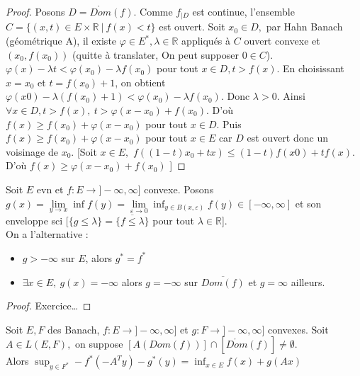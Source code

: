 \begin{proof}
    Posons $D=\mathring{Dom}(f)$. Comme $f_{|D}$ est continue, l'ensemble $C=\{(x,t)\in E\times \mathbb{R} \ |\ f(x)<t\} $ est ouvert. Soit $x_0\in D,$ par Hahn Banach (géométrique A), il existe $\varphi \in E^*,\lambda\in\mathbb{R} $ appliqués à $C$ ouvert convexe et $(x_0,f(x_0))$ (quitte à translater, On peut supposer $0\in C$).\\
    $\varphi (x)-\lambda t<\varphi (x_0)-\lambda f(x_0)$ pour tout $x\in D, t>f(x)$. En choisissant $x=x_0$ et $t=f(x_0)+1$, on obtient $\varphi (x0)-\lambda \left( f(x_0)+1 \right) <\varphi (x_0)-\lambda f(x_0).$ Donc $\lambda>0.$ Ainsi $\forall x\in D,t>f(x),\ t>\varphi (x-x_0)+f(x_0).$ D'où $f(x)\ge f(x_0)+\varphi (x-x_0)$ pour tout $x\in D.$ Puis $f(x)\ge f(x_0)+\varphi (x-x_0)$ pour tout $x\in E$ car $D$ est ouvert donc un voisinage de $x_0.$ [Soit $x\in E,$ $f((1-t)x_0+tx)\le (1-t)f(x0)+tf(x).$ D'où $f(x)\ge \varphi (x-x_0)+f(x_0)$ ]
\end{proof}
\begin{lemme}
    Soit $E$ evn et $f:E\to ]-\infty ,\infty ]$ convexe. Posons $g(x)=\lim\limits_{y\to x}\inf f(y)=\lim\limits_{\varepsilon \to 0} \inf_{y\in B(x,\varepsilon )}f(y)\in [-\infty ,\infty ] $ et son enveloppe sci [$\{g\le \lambda\} =\overline{\{f\le \lambda\} }$ pour tout $\lambda\in \mathbb{R} $].\\
    On a l'alternative :
    \begin{itemize}
        \item $g>-\infty $ sur $E$, alors $g^*=f^*$
        \item $\exists x\in E,\ g(x)=-\infty $ alors $g=-\infty $ sur $\overline{Dom(f)}$ et $g=\infty $ ailleurs.
    \end{itemize}
\end{lemme}
\begin{proof}
    Exercice\ldots
\end{proof}
\begin{theoreme}
    Soit $E,F$ des Banach,  $f:E\to ]-\infty ,\infty ]$ et $g:F\to ]-\infty ,\infty ]$ convexes. Soit $A\in L(E,F),$ on suppose $\left[ A(Dom(f)) \right] \cap \left[ \mathring{Dom}(f) \right] \neq \emptyset .$ \\
    Alors $\sup_{y\in F^*}-f^*(-A^Ty)-g^*(y)=\inf_{x\in E}f(x)+g(Ax)$
\end{theoreme}
